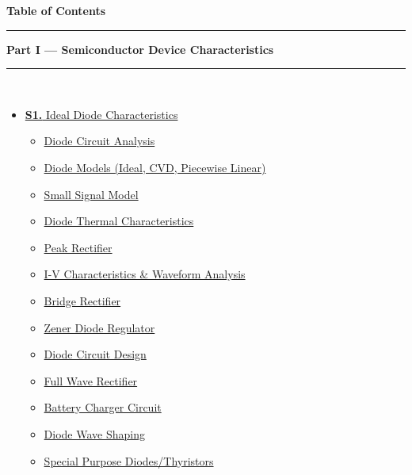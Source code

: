\documentclass[12pt,a4paper]{article}
\begin{document}
\thispagestyle{fancy}
\begin{center}
  {\LARGE\bfseries\textcolor{pblue}{Table of Contents}}\\[6pt]
  \textcolor{pblue}{\rule{0.6\textwidth}{0.8pt}}
\end{center}
\vspace{6pt}

\begin{tcolorbox}[breakable,colback=cA!5,colframe=cA,boxrule=1pt,arc=5pt,
  left=8pt,right=8pt,top=8pt,bottom=8pt,before skip=4pt]
  {\large\bfseries\textcolor{cA}{Part I --- Semiconductor Device Characteristics}}\\[5pt]
  \textcolor{cA!40}{\rule{\textwidth}{0.4pt}}\\[3pt]
  \small\begin{itemize}[leftmargin=1.2em,itemsep=1pt,label={\textcolor{cA}{$\triangleright$}}]
    \item \hyperref[sec:S1]{\textbf{S1.} Ideal Diode Characteristics}
      \begin{itemize}[leftmargin=1.5em,itemsep=0pt,label={\textcolor{cA}{$\cdot$}}]
        \item \hyperref[sub:s1-dc]{Diode Circuit Analysis}
        \item \hyperref[sub:s1-models]{Diode Models (Ideal, CVD, Piecewise Linear)}
        \item \hyperref[sub:s1-ssm]{Small Signal Model}
        \item \hyperref[sub:s1-thermal]{Diode Thermal Characteristics}
        \item \hyperref[sub:s1-peak]{Peak Rectifier}
        \item \hyperref[sub:s1-iv]{I-V Characteristics \& Waveform Analysis}
        \item \hyperref[sub:s1-rectifier]{Bridge Rectifier}
        \item \hyperref[sub:s1-zener]{Zener Diode Regulator}
        \item \hyperref[sub:s1-design]{Diode Circuit Design}
        \item \hyperref[sub:s1-fwr]{Full Wave Rectifier}
        \item \hyperref[sub:s1-battery]{Battery Charger Circuit}
        \item \hyperref[sub:s1-waveshape]{Diode Wave Shaping}
        \item \hyperref[sub:s1-spd]{Special Purpose Diodes/Thyristors}
      \end{itemize}


\end{itemize}
\end{tcolorbox}
\end{document}
